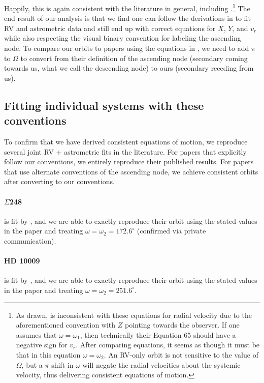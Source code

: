 \documentclass[modern]{aastex61}
\begin{document}
Happily, this is again consistent with the literature in general, including \citet{murray10}.\footnote{As drawn, \citet[Figure 7,][]{murray10} is inconsistent with these equations for radial velocity due to the aforementioned convention with $Z$ pointing towards the observer. If one assumes that $\omega = \omega_1$, then technically their Equation 65 should have a negative sign for $v_r$. After comparing equations, it seems as though it must be that in this equation $\omega = \omega_2$. An RV-only orbit is not sensitive to the value of $\Omega$, but a $\pi$ shift in $\omega$ will negate the radial velocities about the systemic velocity, thus delivering consistent equations of motion.} %
The end result of our analysis is that we find one can follow the derivations in \citet{murray10} to fit RV and astrometric data and still end up with correct equations for $X$, $Y$, and $v_r$ while also respecting the visual binary convention for labeling the ascending node. To compare our orbits to papers using the equations in \citet{murray10}, we need to add $\pi$ to $\Omega$ to convert from their definition of the ascending node (secondary coming towards us, what we call the descending node) to ours (secondary receding from us).

\subsection{Fitting individual systems with these conventions}
To confirm that we have derived consistent equations of motion, we reproduce several joint RV + astrometric fits in the literature. For papers that explicitly follow our conventions, we entirely reproduce their published results. For papers that use alternate conventions of the ascending node, we achieve consistent orbits after converting to our conventions.

\paragraph{$\Sigma$248} is fit by \citet{torres95}, and we are able to exactly reproduce their orbit using the stated values in the paper and treating $\omega = \omega_2 =172.6^\circ$ (confirmed via private communication).

\paragraph{HD 10009} is fit by \citet{pourbaix98}, and we are able to exactly reproduce their orbit using the stated values in the paper and treating $\omega = \omega_2 = 251.6^\circ$.
\end{document}
